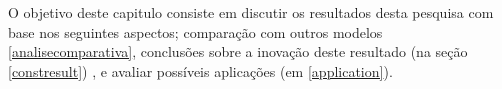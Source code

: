 O objetivo deste capitulo consiste em discutir os resultados desta pesquisa com base nos seguintes aspectos; comparação com outros modelos 
\ref{analisecomparativa}, conclusões sobre a inovação deste resultado (na seção \ref{constresult}) , e avaliar possíveis aplicações (em \ref{application}). 